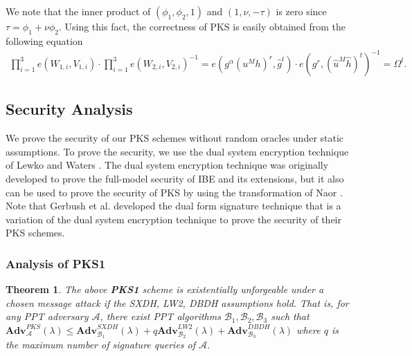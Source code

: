 \documentclass[11pt,letterpaper]{article}
\newtheorem{theorem}{Theorem}[section]
\newcommand{\Adv}{\textbf{Adv}}
\newcommand{\mc}[1]{\mathcal{#1}}
\newcommand{\tb}[1]{\textbf{#1}}
\begin{document}
We note that the inner product of $(\phi_1, \phi_2, 1)$ and $(1, \nu, -\tau)$
is zero since $\tau = \phi_1 + \nu \phi_2$. Using this fact, the correctness
of PKS is easily obtained from the following equation
    \begin{align*}
    \prod_{i=1}^3 e(W_{1,i}, V_{1,i}) \cdot \prod_{i=1}^3 e(W_{2,i}, V_{2,i})^{-1}
        = e(g^{\alpha} (u^M h)^r, \hat{g}^t) \cdot
          e(g^r, (\hat{u}^M \hat{h})^t)^{-1}
        = \Omega^t.
    \end{align*}

\subsection{Security Analysis}

We prove the security of our PKS schemes without random oracles under static
assumptions. To prove the security, we use the dual system encryption
technique of Lewko and Waters \cite{LewkoW10}. The dual system encryption
technique was originally developed to prove the full-model security of IBE
and its extensions, but it also can be used to prove the security of PKS by
using the transformation of Naor \cite{BonehF01}. Note that Gerbush et al.
\cite{GerbushLOW12} developed the dual form signature technique that is a
variation of the dual system encryption technique to prove the security of
their PKS schemes.

\subsubsection{Analysis of PKS1}

\begin{theorem} \label{thm:pks1-prime}
The above \tb{PKS1} scheme is existentially unforgeable under a chosen
message attack if the SXDH, LW2, DBDH assumptions hold. That is, for any PPT
adversary $\mc{A}$, there exist PPT algorithms $\mc{B}_1, \mc{B}_2, \mc{B}_3$
such that
    $\Adv_{\mc{A}}^{PKS}(\lambda)
    \leq \Adv_{\mc{B}_1}^{SXDH}(\lambda) + q \Adv_{\mc{B}_2}^{LW2}(\lambda) +
    \Adv_{\mc{B}_3}^{DBDH}(\lambda)$
where $q$ is the maximum number of signature queries of $\mc{A}$.
\end{theorem}
\end{document}
